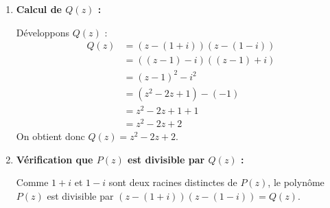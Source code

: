 \documentclass[12pt,a4paper]{article}
\begin{document}
\begin{enumerate}
    Calculons les puissances successives de $1 + i$ :
    $$
    \begin{aligned}
        (1 + i)^2 &= 1 + 2i + i^2 = 2i \\
        (1 + i)^3 &= (1 + i)^2(1 + i) = 2i(1 + i) = 2i + 2i^2 = -2 + 2i \\
        (1 + i)^4 &= \left[(1 + i)^2\right]^2 = (2i)^2 = 4i^2 = -4
    \end{aligned}
    $$
    Substituons ces résultats dans l'expression de $P(1 + i)$ :
    $$
    \begin{aligned}
        P(1 + i) &= (1 + i)^4 - 6(1 + i)^3 + 23(1 + i)^2 - 34(1 + i) + 26 \\
        &= -4 - 6(-2 + 2i) + 23(2i) - 34(1 + i) + 26 \\
        &= -4 + 12 - 12i + 46i - 34 - 34i + 26 \\
        &= (-4 + 12 - 34 + 26) + (-12 + 46 - 34)i \\
        &= 0 + 0i \\
        &= 0
    \end{aligned}
    $$
    Puisque $P(1 + i) = 0$, le nombre complexe $z_1 = 1 + i$ est une solution de l'équation $P(z) = 0$.
    
    D'après la question 1, son conjugué $z_2 = \overline{1 + i} = 1 - i$ est également solution de $P(z) = 0$.
    
    Deux solutions complexes de $P(z) = 0$ sont donc **$1 + i$ et $1 - i$**.

    \item \textbf{Calcul de $Q(z)$ :}
    
    Développons $Q(z)$ :
    $$
    \begin{aligned}
        Q(z) &= \left(z - (1 + i)\right)\left(z - (1 - i)\right) \\
        &= \left((z - 1) - i\right)\left((z - 1) + i\right) \\
        &= (z - 1)^2 - i^2 \\
        &= (z^2 - 2z + 1) - (-1) \\
        &= z^2 - 2z + 1 + 1 \\
        &= z^2 - 2z + 2
    \end{aligned}
    $$
    On obtient donc $Q(z) = z^2 - 2z + 2$.

    \item \textbf{Vérification que $P(z)$ est divisible par $Q(z)$ :}
    
    Comme $1 + i$ et $1 - i$ sont deux racines distinctes de $P(z)$, le polynôme $P(z)$ est divisible par $(z - (1 + i))(z - (1 - i)) = Q(z)$.
    

\end{enumerate}
\end{document}
